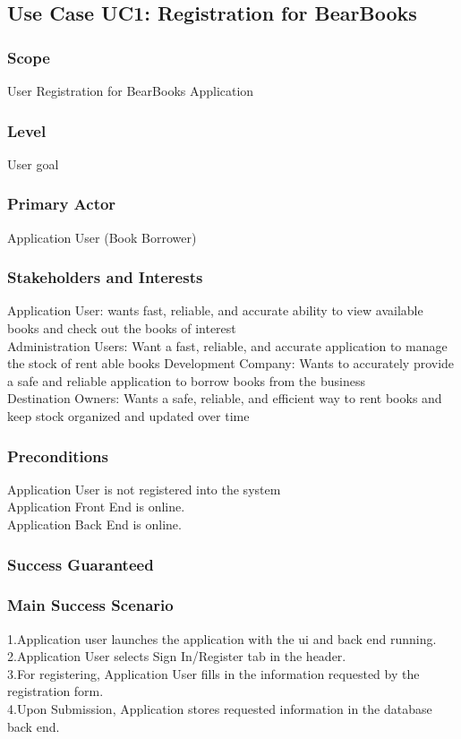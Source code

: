 \documentclass{article}
\begin{document}
	\subsection{Use Case UC1: Registration for BearBooks}
	
	\subsubsection{\textbf{Scope}} 
	User Registration for BearBooks Application
	\subsubsection{\textbf{Level}} 
	User goal
	\subsubsection{\textbf{Primary Actor}} 
	Application User (Book Borrower)
	\subsubsection{\textbf{Stakeholders and Interests}}
	Application User: wants fast, reliable, and accurate ability to view available books and check out the books of interest \\
	Administration Users: Want a fast, reliable, and accurate application to manage the stock of rent able books
	Development Company: Wants to accurately provide a safe and reliable application to borrow books from the business \\
	Destination Owners: Wants a safe, reliable, and efficient way to rent books and keep stock organized and updated over time \\
	\subsubsection{\textbf{Preconditions}}
	Application User is not registered into the system \\
	Application Front End is online. \\
	Application Back End is online. \\
	
	\subsubsection{\textbf{Success Guaranteed}}
	
	\subsubsection{\textbf{Main Success Scenario}}
	1.Application user launches the application with the ui and back end running. \\
	2.Application User selects Sign In/Register tab in the header. \\
	3.For registering, Application User fills in the information requested by the registration form. \\
	4.Upon Submission, Application stores requested information in the database back end. \\
	
\end{document}
